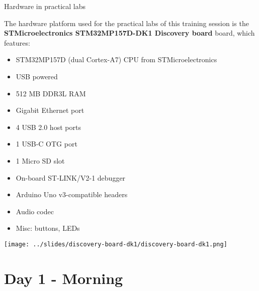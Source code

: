 \documentclass[a4paper,12pt,obeyspaces,spaces,hyphens]{article}
\begin{document}
\feshowtitle

\certificate{}
\disabilities{}

\feagendatwocolumn
{Hardware in practical labs}
{
  The hardware platform used for the practical labs of this training
  session is the {\bf STMicroelectronics STM32MP157D-DK1 Discovery
    board} board, which features:

  \begin{itemize}
  \item STM32MP157D (dual Cortex-A7) CPU from STMicroelectronics
  \item USB powered
  \item 512 MB DDR3L RAM
  \item Gigabit Ethernet port
  \item 4 USB 2.0 host ports
  \item 1 USB-C OTG port
  \item 1 Micro SD slot
  \item On-board ST-LINK/V2-1 debugger
  \item Arduino Uno v3-compatible headers
  \item Audio codec
  \item Misc: buttons, LEDs
  \end{itemize}
}
{}
{
  \begin{center}
  \texttt{[image: ../slides/discovery-board-dk1/discovery-board-dk1.png]}
  \end{center}
}

\section{Day 1 - Morning}
\end{document}
